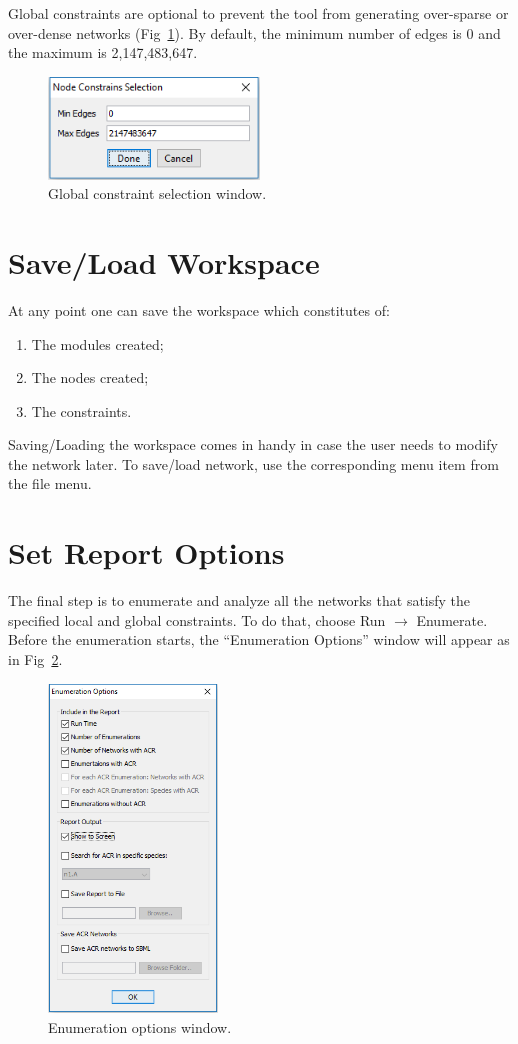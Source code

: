 \documentclass{report}
\begin{document}
Global constraints are optional to prevent the tool from generating over-sparse or over-dense
networks (Fig~\ref{fig:8}). By default, the minimum number of edges is 0 and the maximum is
2,147,483,647.

\begin{figure}
	\centering
		\includegraphics[width=0.5\textwidth]{8}
	\caption{Global constraint selection window.}
	\label{fig:8}
\end{figure}

\section{Save/Load Workspace}
At any point one can save the workspace which constitutes of:
\begin{enumerate}
	\item The modules created;
	\item The nodes created;
	\item The constraints.
\end{enumerate}

Saving/Loading the workspace comes in handy in case the user needs to modify the network
later. To save/load network, use the corresponding menu item from the file menu.

\section{Set Report Options}
The final step is to enumerate and analyze all the networks that satisfy the specified local and
global constraints. To do that, choose Run $\rightarrow$ Enumerate. Before the enumeration starts, the
``Enumeration Options'' window will appear as in Fig~\ref{fig:9}.

\begin{figure}
	\centering
		\includegraphics[width=0.4\textwidth]{9}
	\caption{Enumeration options window.}
	\label{fig:9}
\end{figure}
\end{document}
